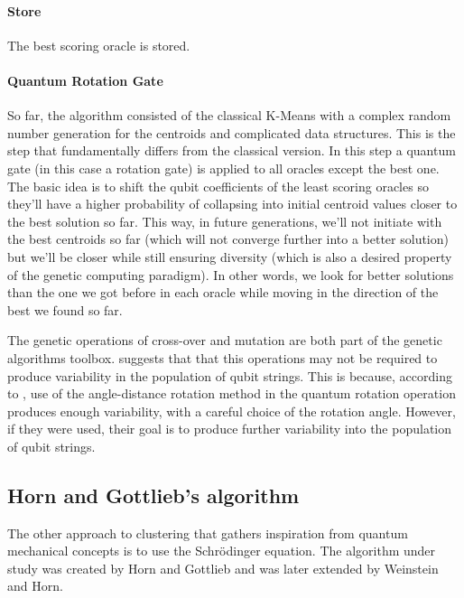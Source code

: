 \paragraph{Store}
The best scoring oracle is stored.

\paragraph{Quantum Rotation Gate}
So far, the algorithm consisted of the classical K-Means with a complex random number generation for the centroids and complicated data structures. This is the step that fundamentally differs from the classical version. In this step a quantum gate (in this case a rotation gate) is applied to all oracles except the best one. The basic idea is to shift the qubit coefficients of the least scoring oracles so they'll have a higher probability of collapsing into initial centroid values closer to the best solution so far. This way, in future generations, we'll not initiate with the best centroids so far (which will not converge further into a better solution) but we'll be closer while still ensuring diversity (which is also a desired property of the genetic computing paradigm). In other words, we look for better solutions than the one we got before in each oracle while moving in the direction of the best we found so far.


The genetic operations of cross-over and mutation are both part of the genetic algorithms toolbox. \cite{Wiebe2014} suggests that that this operations may not be required to produce variability in the population of qubit strings. This is because, according to \cite{Liu2010}, use of the angle-distance rotation method in the quantum rotation operation produces enough variability, with a careful choice of the rotation angle. However, if they were used, their goal is to produce further variability into the population of qubit strings.



\subsection{Horn and Gottlieb's algorithm}
\label{sec:horn}

The other approach to clustering that gathers inspiration from quantum mechanical concepts is to use the Schrödinger equation. The algorithm under study was created by Horn and Gottlieb and was later extended by Weinstein and Horn.

